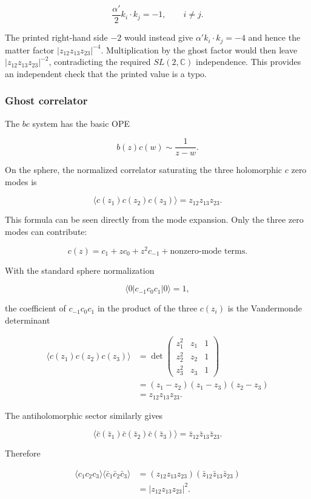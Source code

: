 \documentclass[
  10pt,
  a4paper,
  openany]{book}
\begin{document}
\[
\frac{\alpha'}2 k_i\cdot k_j=-1,
\qquad i\neq j.
\]

The printed right-hand side \(-2\) would instead give
\(\alpha'k_i\cdot k_j=-4\) and hence the matter factor
\(|z_{12}z_{13}z_{23}|^{-4}\). Multiplication by the ghost factor would
then leave \(|z_{12}z_{13}z_{23}|^{-2}\), contradicting the required
\(SL(2,\mathbb C)\) independence. This provides an independent check
that the printed value is a typo.

\subsubsection{Ghost correlator}\label{ghost-correlator}

The \(bc\) system has the basic OPE

\[
b(z)c(w)\sim\frac1{z-w}.
\]

On the sphere, the normalized correlator saturating the three
holomorphic \(c\) zero modes is

\[
\langle c(z_1)c(z_2)c(z_3)\rangle
=z_{12}z_{13}z_{23}.
\]

This formula can be seen directly from the mode expansion. Only the
three zero modes can contribute:

\[
c(z)=c_1+zc_0+z^2c_{-1}+\text{nonzero-mode terms}.
\]

With the standard sphere normalization

\[
\langle0|c_{-1}c_0c_1|0\rangle=1,
\]

the coefficient of \(c_{-1}c_0c_1\) in the product of the three
\(c(z_i)\) is the Vandermonde determinant

\[
\begin{aligned}
\langle c(z_1)c(z_2)c(z_3)\rangle
&=
\det
\begin{pmatrix}
z_1^2&z_1&1\\
z_2^2&z_2&1\\
z_3^2&z_3&1
\end{pmatrix}\\
&=(z_1-z_2)(z_1-z_3)(z_2-z_3)\\
&=z_{12}z_{13}z_{23}.
\end{aligned}
\]

The antiholomorphic sector similarly gives

\[
\langle\bar c(\bar z_1)\bar c(\bar z_2)\bar c(\bar z_3)\rangle
=\bar z_{12}\bar z_{13}\bar z_{23}.
\]

Therefore

\[
\begin{aligned}
\langle c_1c_2c_3\rangle
\langle\bar c_1\bar c_2\bar c_3\rangle
&=(z_{12}z_{13}z_{23})
(\bar z_{12}\bar z_{13}\bar z_{23})\\
&=|z_{12}z_{13}z_{23}|^2.
\end{aligned}
\]
\end{document}
